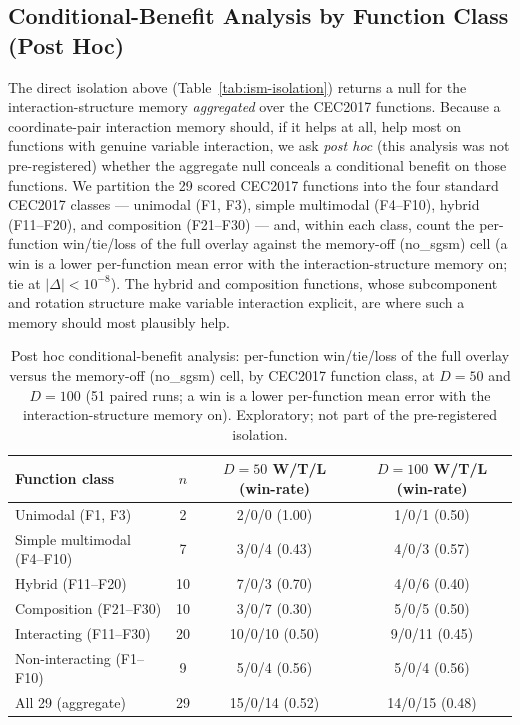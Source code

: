 \documentclass[algorithms,article,submit,moreauthors,pdftex]{Definitions/mdpi}
\begin{document}
\subsection{Conditional-Benefit Analysis by Function Class (Post Hoc)}\label{sec:supp:ablation:subset}

The direct isolation above (Table~\ref{tab:ism-isolation}) returns a null for the
interaction-structure memory \emph{aggregated} over the CEC2017 functions.  Because a
coordinate-pair interaction memory should, if it helps at all, help most on functions
with genuine variable interaction, we ask \emph{post hoc} (this analysis was not
pre-registered) whether the aggregate null conceals a conditional benefit on those
functions.  We partition the 29 scored CEC2017 functions into the four standard
CEC2017 classes --- unimodal (F1, F3), simple multimodal
(F4--F10), hybrid (F11--F20), and composition (F21--F30) --- and, within each class,
count the per-function win/tie/loss of the full overlay against the memory-off
(no\_sgsm) cell (a win is a lower per-function mean error with the
interaction-structure memory on; tie at $|\Delta| < 10^{-8}$).  The hybrid and
composition functions, whose subcomponent and rotation structure make variable
interaction explicit, are where such a memory should most plausibly help.

\begin{table}[H]
\caption{Post hoc conditional-benefit analysis: per-function win/tie/loss of the full
overlay versus the memory-off (no\_sgsm) cell, by CEC2017 function class, at
$D=50$ and $D=100$ (51 paired runs; a win is a lower per-function mean error with the
interaction-structure memory on).  Exploratory; not part of the pre-registered
isolation.}\label{tab:ism-subset}
\centering
\footnotesize
\begin{tabular}{lccc}
\toprule
\textbf{Function class} & \textbf{$n$} & \textbf{$D{=}50$ W/T/L (win-rate)} & \textbf{$D{=}100$ W/T/L (win-rate)}\\
\midrule
Unimodal (F1, F3)            & 2  & 2/0/0 (1.00) & 1/0/1 (0.50)\\
Simple multimodal (F4--F10)  & 7  & 3/0/4 (0.43) & 4/0/3 (0.57)\\
Hybrid (F11--F20)            & 10 & 7/0/3 (0.70) & 4/0/6 (0.40)\\
Composition (F21--F30)       & 10 & 3/0/7 (0.30) & 5/0/5 (0.50)\\
\midrule
Interacting (F11--F30)       & 20 & 10/0/10 (0.50) & 9/0/11 (0.45)\\
Non-interacting (F1--F10)    & 9  & 5/0/4 (0.56) & 5/0/4 (0.56)\\
All 29 (aggregate)           & 29 & 15/0/14 (0.52) & 14/0/15 (0.48)\\
\bottomrule
\end{tabular}
\end{table}
\end{document}
